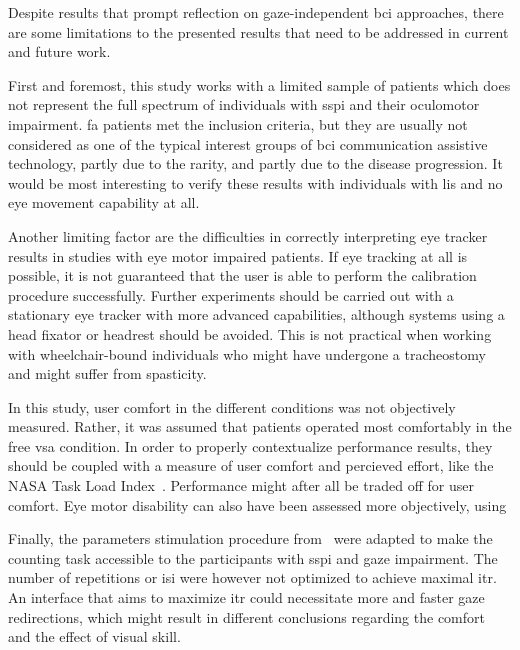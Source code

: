 Despite results that prompt reflection on gaze-independent \ac{bci} approaches,
there are some limitations to the presented results that need to be
addressed in current and future work.

First and foremost, this study works with a limited sample of patients which
does not represent the full spectrum of individuals with \ac{sspi} and their
oculomotor impairment.
\Ac{fa} patients met the inclusion criteria, but they are usually not
considered as one of the typical interest groups of \ac{bci} communication assistive
technology, partly due to the rarity, and partly due to the disease
progression.
It would be most interesting to verify these results with individuals with
\ac{lis} and no eye movement capability at all.


Another limiting factor are the difficulties in correctly interpreting eye
tracker results in studies with eye motor impaired patients.
If eye tracking at all is possible, it is not guaranteed that the user is able
to perform the calibration procedure successfully.
Further experiments should be carried out with a stationary eye tracker with
more advanced capabilities, although systems using a head fixator or headrest
should be avoided.
This is not practical when working with
wheelchair-bound individuals who might have undergone a tracheostomy and might
suffer from spasticity.

In this study, user comfort in the different conditions was not objectively
measured.
Rather, it was assumed that patients operated most comfortably in the free
\ac{vsa} condition.
In order to properly contextualize performance results, they should be coupled
with a measure of user comfort and percieved effort, like the NASA Task Load
Index~\cite{Hart2006}.
Performance might after all be traded off for user comfort.
Eye motor disability can also have been assessed more objectively, using 

Finally, the parameters stimulation procedure
from~\textcite{VanDenKerchove2024} were adapted to make the counting task
accessible to the participants with \ac{sspi} and gaze impairment.
The number of repetitions or \ac{isi} were however not optimized to achieve
maximal \ac{itr}.
An interface that aims to maximize \ac{itr} could necessitate more and faster
gaze redirections, which might result in different conclusions regarding the
comfort and the effect of visual skill.

